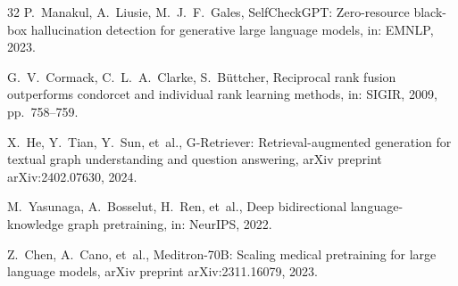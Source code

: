 \documentclass[preprint,12pt]{elsarticle}
\begin{document}
\begin{thebibliography}{32}
P.~Manakul, A.~Liusie, M.~J.~F.~Gales, SelfCheckGPT: Zero-resource black-box hallucination detection for generative large language models, in: EMNLP, 2023.

G.~V.~Cormack, C.~L.~A.~Clarke, S.~B\"uttcher, Reciprocal rank fusion outperforms condorcet and individual rank learning methods, in: SIGIR, 2009, pp.~758--759.

X.~He, Y.~Tian, Y.~Sun, et~al., G-Retriever: Retrieval-augmented generation for textual graph understanding and question answering, arXiv preprint arXiv:2402.07630, 2024.

M.~Yasunaga, A.~Bosselut, H.~Ren, et~al., Deep bidirectional language-knowledge graph pretraining, in: NeurIPS, 2022.

Z.~Chen, A.~Cano, et~al., Meditron-70B: Scaling medical pretraining for large language models, arXiv preprint arXiv:2311.16079, 2023.

\end{thebibliography}
\end{document}
